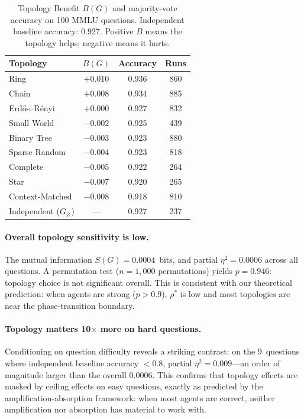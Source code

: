 \documentclass{article}
\begin{document}
\begin{table}[h]
\centering
\caption{Topology Benefit $B(G)$ and majority-vote accuracy on 100 MMLU questions. Independent baseline accuracy: 0.927. Positive $B$ means the topology helps; negative means it hurts.}
\label{tab:phase2a_benefit}
\begin{tabular}{@{}lccc@{}}
\toprule
Topology & $B(G)$ & Accuracy & Runs \\
\midrule
Ring & $+0.010$ & 0.936 & 860 \\
Chain & $+0.008$ & 0.934 & 885 \\
Erd\H{o}s--R\'{e}nyi & $+0.000$ & 0.927 & 832 \\
Small World & $-0.002$ & 0.925 & 439 \\
Binary Tree & $-0.003$ & 0.923 & 880 \\
Sparse Random & $-0.004$ & 0.923 & 818 \\
Complete & $-0.005$ & 0.922 & 264 \\
Star & $-0.007$ & 0.920 & 265 \\
Context-Matched & $-0.008$ & 0.918 & 810 \\
\midrule
Independent ($G_\varnothing$) & --- & 0.927 & 237 \\
\bottomrule
\end{tabular}
\end{table}

\paragraph{Overall topology sensitivity is low.} The mutual information $S(G) = 0.0004$~bits, and partial $\eta^2 = 0.0006$ across all questions. A permutation test ($n = 1{,}000$ permutations) yields $p = 0.946$: topology choice is not significant overall. This is consistent with our theoretical prediction: when agents are strong ($p > 0.9$), $\rho^*$ is low and most topologies are near the phase-transition boundary.

\paragraph{Topology matters 10$\times$ more on hard questions.} Conditioning on question difficulty reveals a striking contrast: on the 9~questions where independent baseline accuracy $< 0.8$, partial $\eta^2 = 0.009$---an order of magnitude larger than the overall $0.0006$. This confirms that topology effects are masked by ceiling effects on easy questions, exactly as predicted by the amplification-absorption framework: when most agents are correct, neither amplification nor absorption has material to work with.
\end{document}
